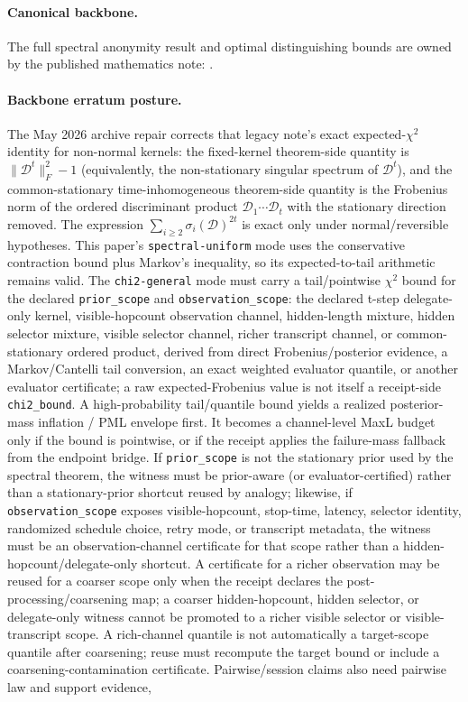 \documentclass[11pt]{article}
\begin{document}
\paragraph{Canonical backbone.}
The full spectral anonymity result and optimal distinguishing bounds are owned by the published mathematics note:
.

\paragraph{Backbone erratum posture.}
The May 2026 archive repair corrects that legacy note's exact expected-$\chi^2$ identity for non-normal kernels: the fixed-kernel theorem-side quantity is $\|\mathcal D^t\|_F^2-1$ (equivalently, the non-stationary singular spectrum of $\mathcal D^t$), and the common-stationary time-inhomogeneous theorem-side quantity is the Frobenius norm of the ordered discriminant product $\mathcal D_1\cdots\mathcal D_t$ with the stationary direction removed. The expression $\sum_{i\ge2}\sigma_i(\mathcal D)^{2t}$ is exact only under normal/reversible hypotheses. This paper's \texttt{spectral-uniform} mode uses the conservative contraction bound plus Markov's inequality, so its expected-to-tail arithmetic remains valid. The \texttt{chi2-general} mode must carry a tail/pointwise $\chi^2$ bound for the declared \texttt{prior\_scope} and \texttt{observation\_scope}: the declared t-step delegate-only kernel, visible-hopcount observation channel, hidden-length mixture, hidden selector mixture, visible selector channel, richer transcript channel, or common-stationary ordered product, derived from direct Frobenius/posterior evidence, a Markov/Cantelli tail conversion, an exact weighted evaluator quantile, or another evaluator certificate; a raw expected-Frobenius value is not itself a receipt-side \texttt{chi2\_bound}. A high-probability tail/quantile bound yields a realized posterior-mass inflation / PML envelope first.  It becomes a channel-level MaxL budget only if the bound is pointwise, or if the receipt applies the failure-mass fallback from the endpoint bridge. If \texttt{prior\_scope} is not the stationary prior used by the spectral theorem, the witness must be prior-aware (or evaluator-certified) rather than a stationary-prior shortcut reused by analogy; likewise, if \texttt{observation\_scope} exposes visible-hopcount, stop-time, latency, selector identity, randomized schedule choice, retry mode, or transcript metadata, the witness must be an observation-channel certificate for that scope rather than a hidden-hopcount/delegate-only shortcut. A certificate for a richer observation may be reused for a coarser scope only when the receipt declares the post-processing/coarsening map; a coarser hidden-hopcount, hidden selector, or delegate-only witness cannot be promoted to a richer visible selector or visible-transcript scope. A rich-channel quantile is not automatically a target-scope quantile after coarsening; reuse must recompute the target bound or include a coarsening-contamination certificate. Pairwise/session claims also need pairwise law and support evidence, 
\end{document}
